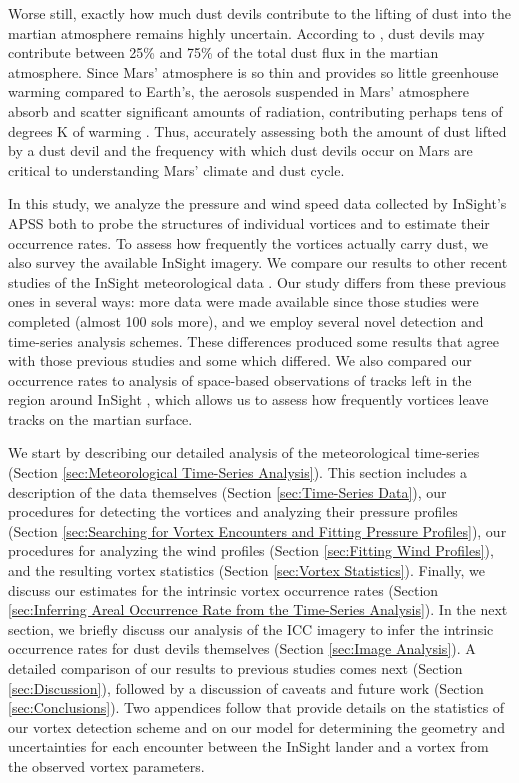 \documentclass[linenumbers,trackchanges]{aastex63}
\begin{document}
Worse still, exactly how much dust devils contribute to the lifting of dust into the martian atmosphere remains highly uncertain. According to \citet{2016SSRv..203...89F}, dust devils may contribute between 25\% and 75\% of the total dust flux in the martian atmosphere. Since Mars' atmosphere is so thin and provides so little greenhouse warming compared to Earth's, the aerosols suspended in Mars' atmosphere absorb and scatter significant amounts of radiation, contributing perhaps tens of degrees K of warming \citep{2002Icar..157..259S, 2004JGRE..10911006B}. Thus, accurately assessing both the amount of dust lifted by a dust devil and the frequency with which dust devils occur on Mars are critical to understanding Mars' climate and dust cycle.

In this study, we analyze the pressure and wind speed data collected by InSight's APSS both to probe the structures of individual vortices and to estimate their occurrence rates. To assess how frequently the vortices actually carry dust, we also survey the available InSight imagery. We compare our results to other recent studies of the InSight meteorological data \citep{2021Icar..35514119L, 2021JGRE..12606511S}. Our study differs from these previous ones in several ways: more data were made available since those studies were completed (almost 100 sols more), and we employ several novel detection and time-series analysis schemes. These differences produced some results that agree with those previous studies and some which differed. We also compared our occurrence rates to analysis of space-based observations of tracks left in the region around InSight \citep{2016Icar..266..315R, 2020GeoRL..4787234P}, which allows us to assess how frequently vortices leave tracks on the martian surface. 

We start by describing our detailed analysis of the meteorological time-series (Section \ref{sec:Meteorological Time-Series Analysis}). This section includes a description of the data themselves (Section \ref{sec:Time-Series Data}), our procedures for detecting the vortices and analyzing their pressure profiles (Section \ref{sec:Searching for Vortex Encounters and Fitting Pressure Profiles}), our procedures for analyzing the wind profiles (Section \ref{sec:Fitting Wind Profiles}), and the resulting vortex statistics (Section \ref{sec:Vortex Statistics}). Finally,  we discuss our estimates for the intrinsic vortex occurrence rates (Section \ref{sec:Inferring Areal Occurrence Rate from the Time-Series Analysis}). In the next section, we briefly discuss our analysis of the ICC imagery to infer the intrinsic occurrence rates for dust devils themselves (Section \ref{sec:Image Analysis}). A detailed comparison of our results to previous studies comes next (Section \ref{sec:Discussion}), followed by a discussion of caveats and future work (Section \ref{sec:Conclusions}). Two appendices follow that provide details on the statistics of our vortex detection scheme and on our model for determining the geometry and uncertainties for each encounter between the InSight lander and a vortex from the observed vortex parameters. 
\end{document}

